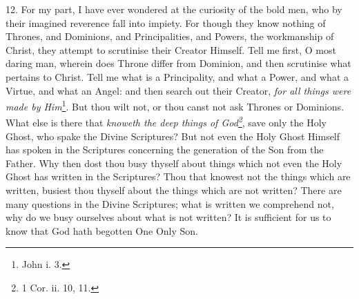 12. For my part, I have ever wondered at the curiosity of the bold men, who by their imagined reverence fall into impiety. For though they know nothing of Thrones, and Dominions, and Principalities, and Powers, the workmanship of Christ, they attempt to scrutinise their Creator Himself. Tell me first, O most daring man, wherein does Throne differ from Dominion, and then scrutinise what pertains to Christ. Tell me what is a Principality, and what a Power, and what a Virtue, and what an Angel: and then search out their Creator, \emph{for all things were made by Him}\footnote{John i. 3.}. But thou wilt not, or thou canst not ask Thrones or Dominions. What else is there that \emph{knoweth the deep things of God\footnote{1 Cor. ii. 10, 11.}}, save only the Holy Ghost, who spake the Divine Scriptures? But not even the Holy Ghost Himself has spoken in the Scriptures concerning the generation of the Son from the Father. Why then dost thou busy thyself about things which not even the Holy Ghost has written in the Scriptures? Thou that knowest not the things which are written, busiest thou thyself about the things which are not written? There are many questions in the Divine Scriptures; what is written we comprehend not, why do we busy ourselves about what is not written? It is sufficient for us to know that God hath begotten One Only Son.

